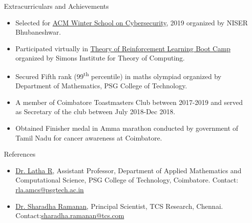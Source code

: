 \documentclass{resume} %
\begin{document}
\begin{rSection}{Extracurriculars and Achievements}
\vspace*{0.1in}
\begin{itemize}[leftmargin=*]
\item Selected for \href{http://www.niser.ac.in/~smishra/event/acmws2019/}{ACM Winter School on Cybersecurity}, 2019 organized by NISER Bhubaneshwar.
\item Participated virtually in \href{https://simons.berkeley.edu/workshops/rl-2020-bc}{Theory of Reinforcement Learning Boot Camp} organized by Simons Institute for Theory of Computing.
\item Secured Fifth rank (99\textsuperscript{th} percentile) in maths olympiad organized by Department of Mathematics, PSG College of Technology.
\item A member of Coimbatore Toastmasters Club between 2017-2019 and served as Secretary of the club between July 2018-Dec 2018.
\item Obtained Finisher medal in Amma marathon conducted by government of Tamil Nadu for cancer awareness at Coimbatore.
\end{itemize}
\end{rSection}

\begin{rSection}{References}
\begin{itemize}[leftmargin=*]
\item \href{https://www.psgtech.edu/facgen.php?id=C3150}{Dr. Latha R}, Assistant Professor,  Department of Applied Mathematics and Computational Science, PSG College of Technology, Coimbatore. Contact: \href{mailto:rla.amcs@psgtech.ac.in}{rla.amcs@psgtech.ac.in}
\item \href{https://www.linkedin.com/in/sharadha-ramanan-43bb4946/}{Dr. Sharadha Ramanan}, Principal Scientist, TCS Research, Chennai. Contact:\href{mailto:sharadha.ramanan@tcs.com}{sharadha.ramanan@tcs.com}
\end{itemize}
\end{rSection}
\end{document}
